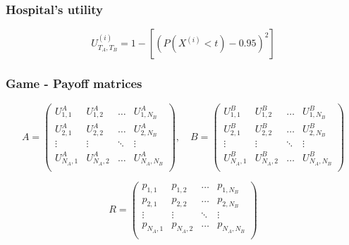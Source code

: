 \begin{frame}
    \frametitle{Hospital's utility}

    \begin{equation*}
        U_{T_A,T_B}^{(i)} = 1 - \left[ (P(X^{(i)} < t) - 0.95)^2 \right]
    \end{equation*}

\end{frame}

\begin{frame}
    \frametitle{Game - Payoff matrices}

    \scriptsize
    \begin{equation*}
        A = 
        \begin{pmatrix}
            U_{1,1}^A & U_{1,2}^A & \dots & U_{1,N_B}^A \\ 
            U_{2,1}^A & U_{2,2}^A & \dots & U_{2,N_B}^A \\
            \vdots & \vdots & \ddots & \vdots \\
            U_{N_A,1}^A & U_{N_A,2}^A & \dots & U_{N_A,N_B}^A \\
        \end{pmatrix}, \quad
        B = 
        \begin{pmatrix}
            U_{1,1}^B & U_{1,2}^B & \dots & U_{1,N_B}^B \\ 
            U_{2,1}^B & U_{2,2}^B & \dots & U_{2,N_B}^B \\
            \vdots & \vdots & \ddots & \vdots \\
            U_{N_A,1}^B & U_{N_A,2}^B & \dots & U_{N_A,N_B}^B \\
        \end{pmatrix}
    \end{equation*}

    \begin{equation*}
        R = 
        \begin{pmatrix}
            p_{1,1} & p_{1,2} & \dots & p_{1,N_B} \\ 
            p_{2,1} & p_{2,2} & \dots & p_{2,N_B} \\
            \vdots & \vdots & \ddots & \vdots \\
            p_{N_A,1} & p_{N_A,2} & \dots & p_{N_A,N_B} \\
        \end{pmatrix}
    \end{equation*}

\end{frame}


